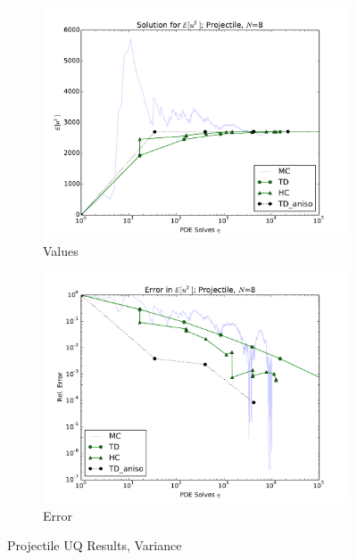 \documentclass{mc2015}
\begin{document}
\begin{figure}[h]
    \centering
    \begin{subfigure}[b]{0.49 \textwidth}
      \includegraphics[width=\textwidth]{../graphics/projectile_solns_aniso_variance}
      \caption{Values}
      \label{atn vals hdmr}
  \end{subfigure}
\begin{subfigure}[b]{0.49 \textwidth}
\centering
      \includegraphics[width=\textwidth]{../graphics/projectile_errs_aniso_variance}
      \caption{Error}
      \label{atn errs hdmr}
    \end{subfigure}
  \caption{Projectile UQ Results, Variance}
  \label{proj anis variance}
  \end{figure}
\end{document}
